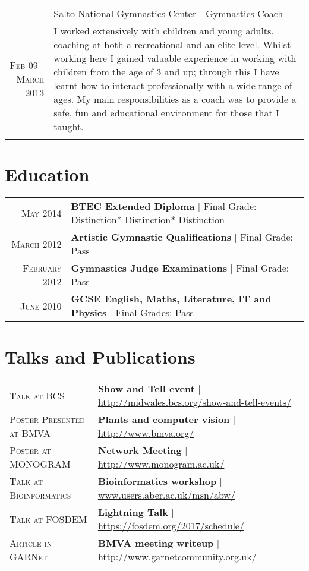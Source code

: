 \documentclass[a4paper,10pt]{article}
\begin{document}
\begin{longtable}{r|p{11cm}}
  &Salto National Gymnastics Center - Gymnastics Coach \\\textsc{Feb 09 - March 2013}
  &\footnotesize{I worked extensively with children and young adults, coaching at both a recreational and an elite level. Whilst working here I gained valuable experience in working with children from the age of 3 and up; through this I have learnt how to interact professionally with a wide range of ages. My main responsibilities as a coach was to provide a safe, fun and educational environment for those that I taught.}\\\multicolumn{2}{c}{} \\
\end{longtable}

\section{Education}
\begin{tabular}{rl}	
  \textsc{May} 2014& \textbf{BTEC Extended Diploma} | Final Grade: Distinction* Distinction* Distinction
  \\
  \textsc{March} 2012& \textbf{Artistic Gymnastic Qualifications} | Final Grade: Pass
  \\
  \textsc{February} 2012& \textbf{Gymnastics Judge Examinations} | Final Grade: Pass
  \\
  \textsc{June} 2010& \textbf{GCSE English, Maths, Literature, IT and Physics} | Final Grades: Pass
\end{tabular}


\section{Talks and Publications}
\begin{tabular}{ll}	
  \textsc{Talk at BCS} & \textbf{Show and Tell event} | \href{http://www.midwales.bcs.org/show-and-tell-events/}{http://midwales.bcs.org/show-and-tell-events/}\\
  \textsc{Poster Presented at BMVA} & \textbf{Plants and computer vision} | \href{http://www.bmva.org/}{http://www.bmva.org/}\\
  \textsc{Poster at MONOGRAM} & \textbf{Network Meeting} | \href{http://www.monogram.ac.uk/}{http://www.monogram.ac.uk/}\\ 
  \textsc{Talk at Bioinformatics} & \textbf{Bioinformatics workshop} | \href{www.users.aber.ac.uk/msn/abw/index.html}{www.users.aber.ac.uk/msn/abw/} \\
  \textsc{Talk at FOSDEM} & \textbf{Lightning Talk} | \href{https://fosdem.org/2017/schedule/}{https://fosdem.org/2017/schedule/}\\
  \textsc{Article in GARNet} & \textbf{BMVA meeting writeup} | \href{http://www.garnetcommunity.org.uk}{http://www.garnetcommunity.org.uk/}                         
\end{tabular}
\end{document}
